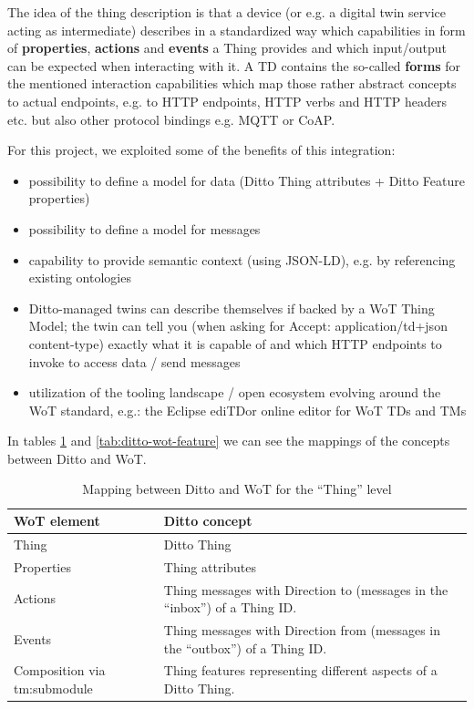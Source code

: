 The idea of the thing description is that a device (or e.g. a digital twin service acting as intermediate) describes in a standardized way which capabilities in form of \textbf{properties}, \textbf{actions} and \textbf{events} a Thing provides and which input/output can be expected when interacting with it.
A TD contains the so-called \textbf{forms} for the mentioned interaction capabilities which map those rather abstract concepts to actual endpoints, e.g. to HTTP endpoints, HTTP verbs and HTTP headers etc. but also other protocol bindings e.g. MQTT or CoAP.

For this project, we exploited some of the benefits of this integration:
\begin{itemize}
    \item possibility to define a model for data (Ditto Thing attributes + Ditto Feature properties)
    \item possibility to define a model for messages
    \item capability to provide semantic context (using JSON-LD), e.g. by referencing existing ontologies
    \item Ditto-managed twins can describe themselves if backed by a WoT Thing Model; the twin can tell you (when asking for Accept: application/td+json content-type) exactly what it is capable of and which HTTP endpoints to invoke to access data / send messages
    \item utilization of the tooling landscape / open ecosystem evolving around the WoT standard, e.g.:
    the Eclipse edi{TD}or online editor for WoT TDs and TMs
\end{itemize}

In tables \ref{tab:ditto-wot-thing} and \ref{tab:ditto-wot-feature} we can see the mappings of the concepts between Ditto and WoT.

\begin{table}[H]
    \begin{tabular}{|p{}|p{}|}
    \hline
    \textbf{WoT element} & \textbf{Ditto concept} \\ \hline
    Thing & Ditto Thing\\ \hline
    Properties & Thing attributes\\ \hline
    Actions & Thing messages with Direction to (messages in the ``inbox'') of a Thing ID.\\ \hline
    Events & 	Thing messages with Direction from (messages in the ``outbox'') of a Thing ID.\\ \hline
    Composition via tm:submodule & Thing features representing different aspects of a Ditto Thing.\\ \hline
    \end{tabular}
    \caption{Mapping between Ditto and WoT for the ``Thing'' level}
    \label{tab:ditto-wot-thing}
\end{table}

